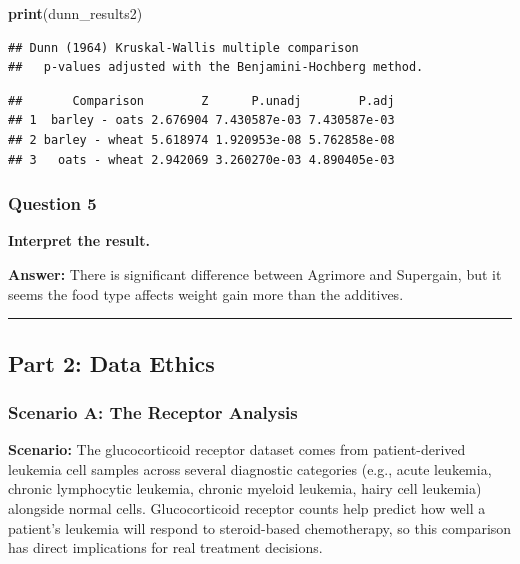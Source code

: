 \documentclass[
]{article}
\newenvironment{Shaded}{\begin{snugshade}}{\end{snugshade}}
\newcommand{\FunctionTok}[1]{\textcolor[rgb]{0.13,0.29,0.53}{\textbf{#1}}}
\newcommand{\NormalTok}[1]{#1}
\begin{document}
\begin{Shaded}
\begin{Highlighting}[]
\FunctionTok{print}\NormalTok{(dunn\_results2)}
\end{Highlighting}
\end{Shaded}

\begin{verbatim}
## Dunn (1964) Kruskal-Wallis multiple comparison
##   p-values adjusted with the Benjamini-Hochberg method.
\end{verbatim}

\begin{verbatim}
##       Comparison        Z      P.unadj        P.adj
## 1  barley - oats 2.676904 7.430587e-03 7.430587e-03
## 2 barley - wheat 5.618974 1.920953e-08 5.762858e-08
## 3   oats - wheat 2.942069 3.260270e-03 4.890405e-03
\end{verbatim}

\subsubsection{Question 5}\label{question-5}

\textbf{Interpret the result.}

\textbf{Answer:} There is significant difference between Agrimore and
Supergain, but it seems the food type affects weight gain more than the
additives.

\begin{center}\rule{0.5\linewidth}{0.5pt}\end{center}

\subsection{Part 2: Data Ethics}\label{part-2-data-ethics}

\subsubsection{Scenario A: The Receptor
Analysis}\label{scenario-a-the-receptor-analysis}

\textbf{Scenario:} The glucocorticoid receptor dataset comes from
patient-derived leukemia cell samples across several diagnostic
categories (e.g., acute leukemia, chronic lymphocytic leukemia, chronic
myeloid leukemia, hairy cell leukemia) alongside normal cells.
Glucocorticoid receptor counts help predict how well a patient's
leukemia will respond to steroid-based chemotherapy, so this comparison
has direct implications for real treatment decisions.
\end{document}
